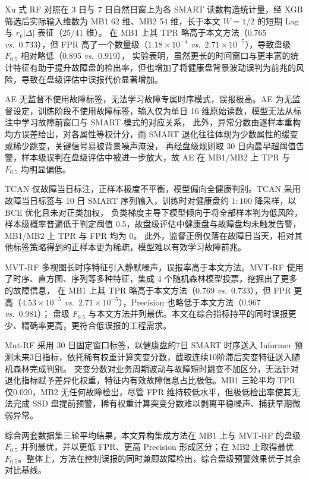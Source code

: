 Xu 式 RF 对照在 3 日与 7 日自然日窗上为各 SMART 读数构造统计量，经 XGB 筛选后实际输入维数为 MB1 62 维、MB2 54 维，长于本文 $W{=}1$/2 的短期 Lag 与 $r_k|\Delta|$ 表征（25/41 维）。
在 MB1 上其 TPR 略高于本文方法（0.765 \emph{vs.}\ 0.733），但 FPR 高了一个数量级（$1.18\times10^{-4}$ \emph{vs.}\ $2.71\times10^{-5}$），导致盘级 $F_{0.5}$ 相对略低（0.895 \emph{vs.}\ 0.919），
实验表明，虽然更长的时间窗口与更丰富的统计特征有助于提升故障盘的检出率，但也增加了将健康盘背景波动误判为前兆的风险，导致在盘级评估中误报代价显著增加。

AE 无监督不使用故障标签，无法学习故障专属时序模式，误报极高。AE 为无监督设定，训练阶段不使用故障标签，输入仅为单日 16 维原始读数，模型无法从标注中学习故障前窗口与 SMART 模式的对应关系，
此外，异常分数由逐样本重构均方误差给出，对各属性等权计分，而 SMART 退化往往体现为少数属性的缓变或稀少跳变，关键信号易被背景噪声淹没，
再经盘级规则取 30 日内最早超阈值告警，样本级误判在盘级评估中被进一步放大，故 AE 在 MB1/MB2 上 TPR 与 $F_{0.5}$ 均明显偏低。

TCAN 仅故障当日标注，正样本极度不平衡，模型偏向全健康判别。TCAN 采用故障当日标签与 10 日 SMART 序列输入，训练时对健康盘约 $1{:}100$ 降采样，以 BCE 优化且未对正类加权，
负类梯度主导下模型倾向于将全部样本判为低风险，样本级概率普遍低于判定阈值 0.5，故盘级评估中健康盘与故障盘均未触发告警，MB1/MB2 上 TPR 与 FPR 均为 0。
此外，监督正例仅落在故障日当天，相对其他标签策略得到的正样本更为稀疏，模型难以有效学习故障前兆。

MVT-RF 多视图长时序特征引入静默噪声，误报率高于本文方法。MVT-RF 使用了时序、直方图、序列等多种特征，集成 4 个随机森林模型投票，挖掘出了更多的故障信息，
在 MB1 上其 TPR 略高于本文方法（0.769 \emph{vs.}\ 0.733），但 FPR 更高（$4.53\times10^{-5}$ \emph{vs.}\ $2.71\times10^{-5}$），Precision 也略低于本文方法（0.967 \emph{vs.}\ 0.981）；
盘级 $F_{0.5}$ 与本文方法并列最优。本文在综合指标持平的同时误报更少、精确率更高，更符合低误报的工程需求。

Mut-RF 采用 30 日固定窗口标签，以健康盘的7日 SMART 时序送入 Informer 预测未来3日指标，依托稀有权重计算突变分数，截取连续10阶滞后突变特征送入随机森林完成判别。
突变分数对业务周期波动与故障短时跳变不加区分，无法针对退化指标赋予差异化权重，特征内有效故障信息占比极低。MB1 三轮平均 TPR 仅0.020，MB2 无任何故障检出，尽管 FPR 维持较低水平，但极低检出率使其无法完成 SSD 盘提前预警，稀有权重计算突变分数难以剥离平稳噪声、捕获早期微弱异常。

综合两套数据集三轮平均结果，本文异构集成方法在 MB1 上与 MVT-RF 的盘级 $F_{0.5}$ 并列最优，并以更低 FPR、更高 Precision 形成区分；在 MB2 上取得最优 $F_{0.5}$。整体上，方法在控制误报的同时兼顾故障检出，综合盘级预警效果优于其余对比基线。
